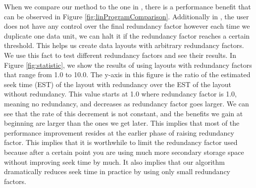 When we compare our method to the one in \cite{optimizingredundancy}, there is a performance benefit that can be observed in Figure \ref{fig:linProgramComparison}. Additionally in \cite{optimizingredundancy}, the user does not have any control over the final redundancy factor however each time we duplicate one data unit, we can halt it if the redundancy factor reaches a certain threshold. This helps us create data layouts with arbitrary redundancy factors. We use this fact to test different redundancy factors and see their results. In Figure \ref{fig:statistic}, we show the results of using layouts with redundancy factors that range from 1.0 to 10.0. The y-axis in this figure is the ratio of the estimated seek time (EST) of the layout with redundancy over the EST of the layout without redundancy. This value starts at 1.0 where redundancy factor is 1.0, meaning no redundancy, and decreases as redundancy factor goes larger. We can see that the rate of this decrement is not constant, and the benefits we gain at beginning are larger than the ones we get later. This implies that most of the performance improvement resides at the earlier phase of raising redundancy factor. This implies that it is worthwhile to limit the redundancy factor used because after a certain point you are using much more secondary storage space without improving seek time by much. It also implies that our algorithm dramatically reduces seek time in practice by using only small redundancy factors. 


